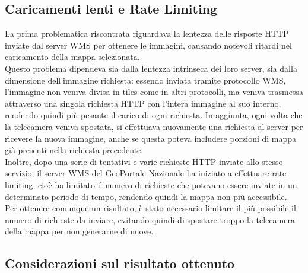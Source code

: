 \subsection{Caricamenti lenti e Rate Limiting}

La prima problematica riscontrata riguardava la lentezza delle risposte HTTP inviate dal server WMS per ottenere le immagini, causando notevoli ritardi nel caricamento della mappa selezionata.
\\Questo problema dipendeva sia dalla lentezza intrinseca dei loro server, sia dalla dimensione dell'immagine richiesta: essendo inviata tramite protocollo WMS, l'immagine non veniva divisa in tiles come in altri protocolli, ma veniva trasmessa attraverso una singola richiesta HTTP con l'intera immagine al suo interno, rendendo quindi più pesante il carico di ogni richiesta. In aggiunta, ogni volta che la telecamera veniva spostata, si effettuava nuovamente una richiesta al server per ricevere la nuova immagine, anche se questa poteva includere porzioni di mappa già presenti nella richiesta precedente.
\\Inoltre, dopo una serie di tentativi e varie richieste HTTP inviate allo stesso servizio, il server WMS del GeoPortale Nazionale ha iniziato a effettuare rate-limiting, cioè ha limitato il numero di richieste che potevano essere inviate in un determinato periodo di tempo, rendendo quindi la mappa non più accessibile.
\\Per ottenere comunque un risultato, è stato necessario limitare il più possibile il numero di richieste da inviare, evitando quindi di spostare troppo la telecamera della mappa per non generarne di nuove. 

\subsection{Considerazioni sul risultato ottenuto}

